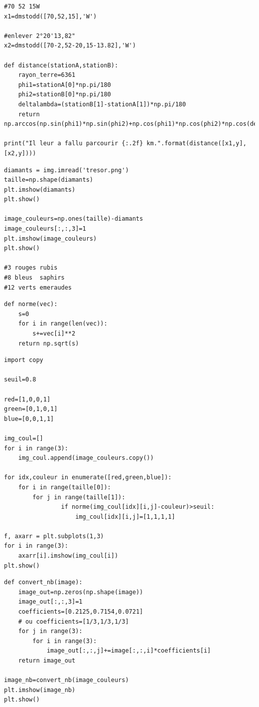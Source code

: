 \reponse{}

\begin{verbatim}
#70 52 15W
x1=dmstodd([70,52,15],'W')

#enlever 2°20'13,82"
x2=dmstodd([70-2,52-20,15-13.82],'W')

def distance(stationA,stationB):
    rayon_terre=6361
    phi1=stationA[0]*np.pi/180
    phi2=stationB[0]*np.pi/180
    deltalambda=(stationB[1]-stationA[1])*np.pi/180
    return np.arccos(np.sin(phi1)*np.sin(phi2)+np.cos(phi1)*np.cos(phi2)*np.cos(deltalambda))*rayon_terre

print("Il leur a fallu parcourir {:.2f} km.".format(distance([x1,y],[x2,y])))
\end{verbatim}

\reponse{}

\begin{verbatim}
diamants = img.imread('tresor.png')
taille=np.shape(diamants)
plt.imshow(diamants)
plt.show()

image_couleurs=np.ones(taille)-diamants
image_couleurs[:,:,3]=1
plt.imshow(image_couleurs)
plt.show()

#3 rouges rubis
#8 bleus  saphirs
#12 verts emeraudes
\end{verbatim}

\reponse{}

\begin{verbatim}
def norme(vec):
    s=0
    for i in range(len(vec)):
        s+=vec[i]**2
    return np.sqrt(s)
\end{verbatim}

\reponse{}

\begin{verbatim}
import copy

seuil=0.8

red=[1,0,0,1]
green=[0,1,0,1]
blue=[0,0,1,1]

img_coul=[]
for i in range(3):
    img_coul.append(image_couleurs.copy())

for idx,couleur in enumerate([red,green,blue]):
    for i in range(taille[0]):
        for j in range(taille[1]):
                if norme(img_coul[idx][i,j]-couleur)>seuil:
                    img_coul[idx][i,j]=[1,1,1,1]
                    
f, axarr = plt.subplots(1,3)
for i in range(3):
    axarr[i].imshow(img_coul[i])
plt.show()
\end{verbatim}

\reponse{}

\begin{verbatim}
def convert_nb(image):
    image_out=np.zeros(np.shape(image))
    image_out[:,:,3]=1
    coefficients=[0.2125,0.7154,0.0721]
	# ou coefficients=[1/3,1/3,1/3]    
    for j in range(3):
        for i in range(3):
            image_out[:,:,j]+=image[:,:,i]*coefficients[i]
    return image_out

image_nb=convert_nb(image_couleurs)
plt.imshow(image_nb)
plt.show()
\end{verbatim}

